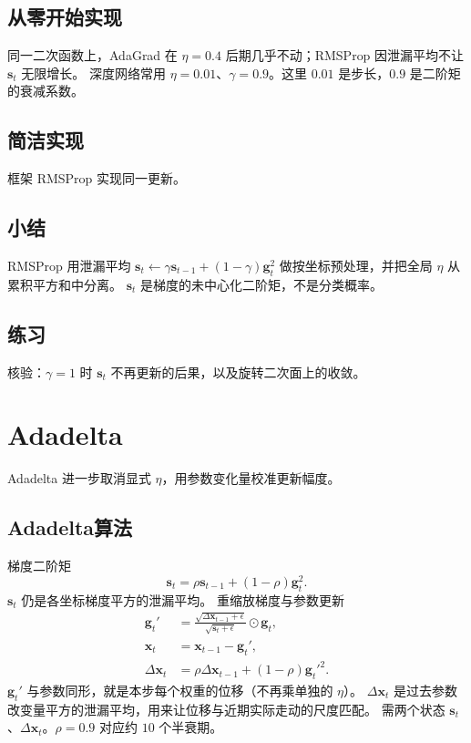 \subsection{从零开始实现}

同一二次函数上，AdaGrad 在 $\eta=0.4$ 后期几乎不动；RMSProp 因泄漏平均不让 $\bm{s}_t$ 无限增长。
深度网络常用 $\eta=0.01$、$\gamma=0.9$。这里 $0.01$ 是步长，$0.9$ 是二阶矩的衰减系数。

\subsection{简洁实现}

框架 RMSProp 实现同一更新。

\subsection{小结}

RMSProp 用泄漏平均 $\bm{s}_t\leftarrow\gamma\bm{s}_{t-1}+(1-\gamma)\bm{g}_t^2$ 做按坐标预处理，并把全局 $\eta$ 从累积平方和中分离。
$\bm{s}_t$ 是梯度的未中心化二阶矩，不是分类概率。

\subsection{练习}

核验：$\gamma=1$ 时 $\bm{s}_t$ 不再更新的后果，以及旋转二次面上的收敛。

\section{Adadelta}

Adadelta 进一步取消显式 $\eta$，用参数变化量校准更新幅度。

\subsection{Adadelta算法}

梯度二阶矩
\[
\bm{s}_t=\rho\bm{s}_{t-1}+(1-\rho)\bm{g}_t^2.
\]
$\bm{s}_t$ 仍是各坐标梯度平方的泄漏平均。
重缩放梯度与参数更新
\begin{align*}
\bm{g}_t'
&=
\frac{\sqrt{\Delta\bm{x}_{t-1}+\epsilon}}{\sqrt{\bm{s}_t+\epsilon}}\odot\bm{g}_t,
\\
\bm{x}_t&=\bm{x}_{t-1}-\bm{g}_t',
\\
\Delta\bm{x}_t
&=\rho\Delta\bm{x}_{t-1}+(1-\rho){\bm{g}_t'}^2.
\end{align*}
$\bm{g}_t'$ 与参数同形，就是本步每个权重的位移（不再乘单独的 $\eta$）。
$\Delta\bm{x}_t$ 是过去参数改变量平方的泄漏平均，用来让位移与近期实际走动的尺度匹配。
需两个状态 $\bm{s}_t$、$\Delta\bm{x}_t$。$\rho=0.9$ 对应约 $10$ 个半衰期。

